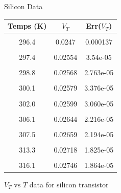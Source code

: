 \documentclass[12pt,letterpaper,twocolumn]{article}
\begin{document}
\begin {table}[H]
\caption*{Silicon Data}
{\footnotesize
\begin {center}
\begin {tabular} {|c | c | c| }
\hline
Temps (K) 			&    $V_T$		& Err($V_T$)\\
\hline  &&\\
296.4   & 0.0247 &  0.000137\\
\hline  && \\
297.4   & 0.02554 &  3.54e-05\\
\hline  && \\
298.8   & 0.02568 &  2.763e-05\\
\hline  && \\
300.1   & 0.02579 &  3.376e-05\\
\hline  && \\
302.0   & 0.02599 &  3.060e-05\\
\hline  && \\
306.1   & 0.02644 &  2.216e-05\\
\hline  && \\
307.5   & 0.02659 &  2.194e-05\\
\hline  && \\
313.3   & 0.02718 &  1.825e-05\\
\hline  && \\
316.1	& 0.02746 &  1.864e-05\\
\hline%
\end {tabular}
\end {center}
}
\caption{\label{tab1} $V_T \text{ vs } T$ data for silicon transistor}
\end {table}
\end{document}

